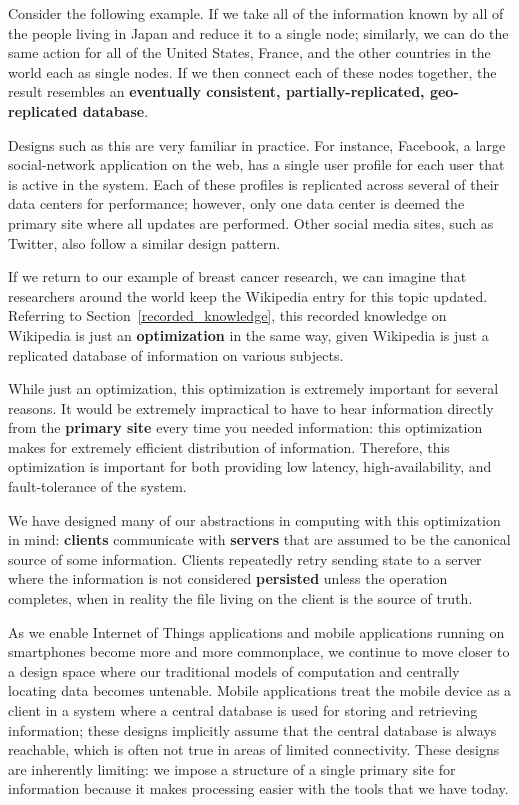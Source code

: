 \documentclass[english]{article}
\begin{document}
Consider the following example.  If we take all of the information known by all of the people living in Japan and reduce it to a single node; similarly, we can do the same action for all of the United States, France, and the other countries in the world each as single nodes.  If we then connect each of these nodes together, the result resembles an \textbf{eventually consistent, partially-replicated, geo-replicated database}.

Designs such as this are very familiar in practice.  For instance, Facebook, a large social-network application on the web, has a single user profile for each user that is active in the system.  Each of these profiles is replicated across several of their data centers for performance; however, only one data center is deemed the primary site where all updates are performed.  Other social media sites, such as Twitter, also follow a similar design pattern.

If we return to our example of breast cancer research, we can imagine that researchers around the world keep the Wikipedia entry for this topic updated.  Referring to Section~\ref{recorded_knowledge}, this recorded knowledge on Wikipedia is just an \textbf{optimization} in the same way, given Wikipedia is just a replicated database of information on various subjects.

While just an optimization, this optimization is extremely important for several reasons.  It would be extremely impractical to have to hear information directly from the \textbf{primary site} every time you needed information: this optimization makes for extremely efficient distribution of information.  Therefore, this optimization is important for both providing low latency, high-availability, and fault-tolerance of the system.

We have designed many of our abstractions in computing with this optimization in mind: \textbf{clients} communicate with \textbf{servers} that are assumed to be the canonical source of some information.  Clients repeatedly retry sending state to a server where the information is not considered \textbf{persisted} unless the operation completes, when in reality the file living on the client is the source of truth.

As we enable Internet of Things applications and mobile applications running on smartphones become more and more commonplace, we continue to move closer to a design space where our traditional models of computation and centrally locating data becomes untenable.  Mobile applications treat the mobile device as a client in a system where a central database is used for storing and retrieving information; these designs implicitly assume that the central database is always reachable, which is often not true in areas of limited connectivity. These designs are inherently limiting: we impose a structure of a single primary site for information because it makes processing easier with the tools that we have today.
\end{document}

